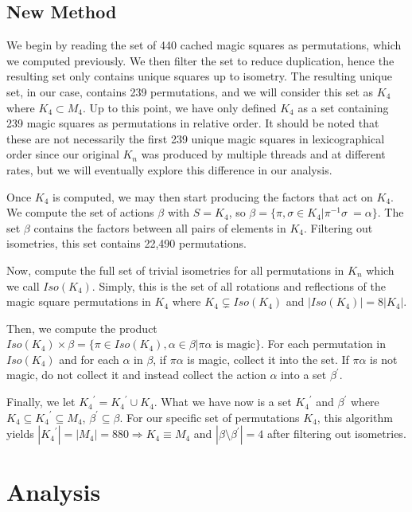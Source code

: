 \documentclass{rhumj_new}
\begin{document}
\subsection{New Method}

We begin by reading the set of 440 cached magic squares as permutations, which we computed
previously. We then filter the set to reduce duplication, hence the resulting set only contains
unique squares up to isometry. The resulting unique set, in our case, contains 239 permutations,
and we will consider this set as $K_4$ where $K_4\subset M_4$. Up to this point, we have only
defined $K_4$ as a set containing 239 magic squares as permutations in relative order. It should be
noted that these are not necessarily the first 239 unique magic squares in lexicographical order
since our original $K_n$ was produced by multiple threads and at different rates, but we will
eventually explore this difference in our analysis.

Once $K_4$ is computed, we may then start producing the factors that act on $K_4$. We compute the
set of actions $\beta$ with $S = K_4$, so  $\beta = \{\pi,\sigma\in K_4| \pi^{-1}\sigma\ =
  \alpha\}$. The set $\beta$ contains the factors between all pairs of elements in $K_4$. Filtering
out isometries, this set contains 22,490 permutations.

Now, compute the full set of trivial isometries for all permutations in $K_n$ which we call
$Iso(K_4)$. Simply, this is the set of all rotations and reflections of the magic square
permutations in $K_4$ where $K_4\subsetneq Iso(K_4)$ and $|Iso(K_4)| = 8|K_4|$.

Then, we compute the product $Iso(K_4)\times\beta = \{\pi\in Iso(K_4),\alpha\in\beta | \pi\alpha
  \text{ is magic}\}$. For each permutation in $Iso(K_4)$ and for each $\alpha$ in $\beta$, if
$\pi\alpha$ is magic, collect it into the set. If $\pi\alpha$ is not magic, do not collect it and
instead collect the action $\alpha$ into a set ${\beta}^\prime$.

Finally, we let ${K_4}^\prime = {K_4}^\prime \cup K_4$. What we have now is a set ${K_4}^\prime$
and ${\beta}^\prime$ where $K_4 \subseteq {K_4}^\prime \subseteq M_4$, ${\beta}^\prime \subseteq
  \beta$. For our specific set of permutations $K_4$, this algorithm yields $|{K_4}^\prime| = |M_4|
  =
  880 \Rightarrow K_4 \equiv M_4$ and $|\beta \setminus{\beta}^\prime| = 4$ after filtering out
isometries.

\section{Analysis}
\end{document}
